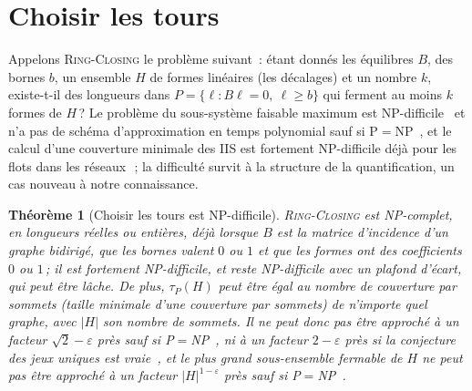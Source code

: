 \documentclass[11pt,a4paper]{article}
\newtheorem{theorem}{Théorème}
\newcommand{\RC}{\textup{\textsc{Ring-Closing}}}
\newcommand{\lean}[1]{\texttt{\detokenize{#1}}}
\newenvironment{evidence}[3][]{}{}
\begin{document}
\section{Choisir les tours}\label{sec:choosing}

Appelons \RC{} le problème suivant~: étant donnés les équilibres $B$, des
bornes $b$, un ensemble $H$ de formes linéaires (les décalages) et un nombre
$k$, existe-t-il des longueurs dans $P = \{\ell : B\ell = 0,\ \ell \ge b\}$
qui ferment au moins $k$ formes de $H$\,? Le problème du sous-système
faisable maximum est NP-difficile~\cite[\S1]{amaldi2003maxfs} et n'a pas de
schéma d'approximation en temps polynomial sauf si
P${}={}$NP~\cite{amaldi1995complexity}, et le calcul d'une couverture minimale
des IIS est fortement NP-difficile déjà pour les flots dans les
réseaux~\cite{joormann2015flowiis}\,; la difficulté survit à la structure de
la quantification, un cas nouveau à notre connaissance.

\begin{evidence}{core}{la réduction~: \lean{closable_iff_independent}, \lean{tauP_eq_vertex_cover}, $B$ bidirigé~: \lean{Gadget.balance_isBidirected}, \lean{Gadget.feasible_iff}\,; la NP-difficulté de Stable et de Couverture par sommets, et les bornes d'approximation, sont citées}
\begin{theorem}[Choisir les tours est NP-difficile]\label{thm:nphard}
\RC{} est NP-complet, en longueurs réelles ou entières, déjà lorsque $B$ est
la matrice d'incidence d'un graphe bidirigé, que les bornes valent $0$ ou $1$
et que les formes ont des coefficients $0$ ou $1$\,; il est fortement
NP-difficile, et reste NP-difficile avec un plafond d'écart, qui peut être
lâche. De plus, $\tau_P(H)$ peut être égal au nombre de couverture par
sommets (taille minimale d'une couverture par sommets) de n'importe quel
graphe, avec $|H|$ son nombre de sommets. Il ne peut donc pas être approché à
un facteur $\sqrt2 - \varepsilon$ près sauf si
P${}={}$NP~\cite{khot2017independent,dinur2018towards,dinur2018nonoptimally,khot2018grassmann},
ni à un facteur $2 - \varepsilon$ près si la conjecture des jeux uniques est
vraie~\cite{khot2008vertex}, et le plus grand sous-ensemble fermable de $H$ ne
peut pas être approché à un facteur $|H|^{1-\varepsilon}$ près sauf si
P${}={}$NP~\cite{hastad1999clique,zuckerman2007linear}.
\end{theorem}
\end{evidence}
\end{document}
